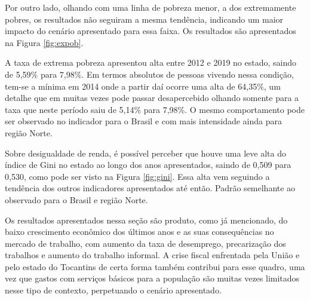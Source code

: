 \par Por outro lado, olhando com uma linha de pobreza menor, a dos extremamente pobres, os resultados não seguiram a mesma tendência, indicando um maior impacto do cenário apresentado para essa faixa. Os resultados são apresentados na Figura \ref{fig:expob}.

\par A taxa de extrema pobreza apresentou alta entre 2012 e 2019 no estado, saindo de 5,59\% para 7,98\%. Em termos absolutos de pessoas vivendo nessa condição, tem-se a mínima em 2014 onde a partir daí ocorre uma alta de 64,35\%, um detalhe que em muitas vezes pode passar desapercebido olhando somente para a taxa que neste período saiu de 5,14\% para 7,98\%. O mesmo comportamento pode ser observado no indicador para o Brasil e com mais intensidade ainda para região Norte.

\par Sobre desigualdade de renda, é possível perceber que houve uma leve alta do índice de Gini no estado ao longo dos anos apresentados, saindo de 0,509 para 0,530, como pode ser visto na Figura \ref{fig:gini}. Essa alta vem seguindo a tendência dos outros indicadores apresentados até então. Padrão semelhante ao observado para o Brasil e região Norte.
\par Os resultados apresentados nessa seção são produto, como já mencionado, do baixo crescimento econômico dos últimos anos e as suas consequências no mercado de trabalho, com aumento da taxa de desemprego, precarização dos trabalhos e aumento do trabalho informal. A crise fiscal enfrentada pela União e pelo estado do Tocantins de certa forma também contribui para esse quadro, uma vez que gastos com serviços básicos para a população são muitas vezes limitados nesse tipo de contexto, perpetuando o cenário apresentado.


